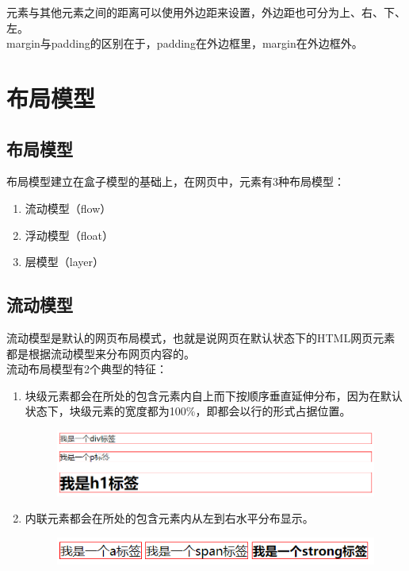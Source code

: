 元素与其他元素之间的距离可以使用外边距来设置，外边距也可分为上、右、下、左。\\

margin与padding的区别在于，padding在外边框里，margin在外边框外。

\newpage

\section{布局模型}

\subsection{布局模型}

布局模型建立在盒子模型的基础上，在网页中，元素有3种布局模型：

\begin{enumerate}
	\item 流动模型（flow）
	\item 浮动模型（float）
	\item 层模型（layer）
\end{enumerate}

\vspace{0.5cm}

\subsection{流动模型}

流动模型是默认的网页布局模式，也就是说网页在默认状态下的HTML网页元素都是根据流动模型来分布网页内容的。\\

流动布局模型有2个典型的特征：

\begin{enumerate}
	\item 块级元素都会在所处的包含元素内自上而下按顺序垂直延伸分布，因为在默认状态下，块级元素的宽度都为100\%，即都会以行的形式占据位置。
	      \begin{figure}[H]
		      \centering
		      \includegraphics[scale=0.7]{img/C8/8-3/1.png}
	      \end{figure}

	\item 内联元素都会在所处的包含元素内从左到右水平分布显示。
	      \begin{figure}[H]
		      \centering
		      \includegraphics[]{img/C8/8-3/2.png}
	      \end{figure}
\end{enumerate}

